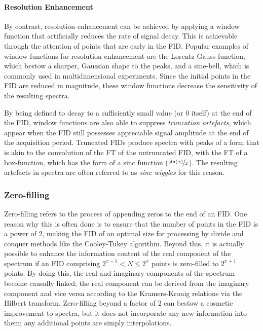 \paragraph{Resolution Enhancement} By contrast, resolution enhancement can be
achieved by applying a window function that artificially reduces the rate of
signal decay. This is achievable through the attention of points that are
early in the \ac{FID}. Popular
examples of window functions for resolution enhancement are the Lorentz-Gauss
function, which bestow a sharper, Gaussian shape to the peaks, and a
sine-bell, which is commonly used in multidimensional experiments. Since the
initial points in the \ac{FID} are reduced in magnitude, these window functions
decrease the sensitivity of the resulting spectra.

By being defined to decay to a sufficiently small value (or $0$ itself) at the
end of
the \ac{FID}, window functions are also able to suppress \emph{truncation
artefacts}, which appear when the \ac{FID} still possesses appreciable signal
amplitude at the end of the acquisition period. Truncated \acp{FID} produce
spectra with peaks of a form that is akin to the convolution of the \ac{FT} of
the untruncated \ac{FID}, with the \ac{FT} of a box-function, which has the
form of a sinc function ($\nicefrac{\sin(x)}{x}$). The resulting artefacts in
spectra are often referred to as \emph{sinc wiggles} for this reason.

\subsubsection{Zero-filling}
Zero-filling refers to the process of appending zeros to the end of an
\ac{FID}. One reason why this is often done is to ensure that the number of
points in the \ac{FID} is a power of 2, making the \ac{FID} of an optimal size
for processing by divide and conquer methods like the Cooley-Tukey
algorithm\cite{Cooley1965}. Beyond this, it is actually
possible to enhance the information content of the real component of the
spectrum if an \ac{FID} comprising $2^{x-1} < N \leq 2^x$ points is zero-filled
to $2^{x+1}$ points\cite{Bartholdi1973}. By doing this, the real and imaginary
components of
the spectrum become causally linked; the real component can be derived from the
imaginary component and vice versa according to the Kramers-Kronig relations
via the Hilbert transform.
Zero-filling beyond a factor of 2 can bestow a
cosmetic improvement to spectra, but it does not incorporate any new
information into them; any additional points are simply interpolations.

